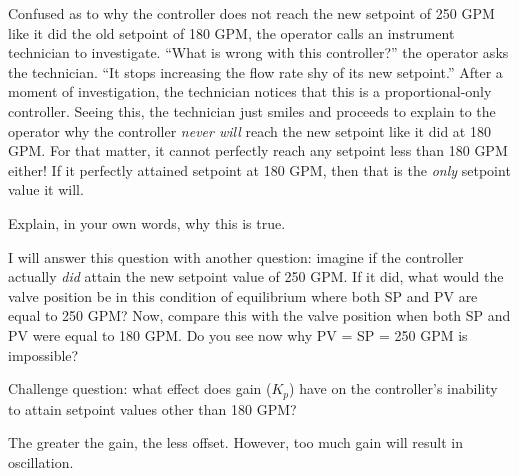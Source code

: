 Confused as to why the controller does not reach the new setpoint of 250 GPM like it did the old setpoint of 180 GPM, the operator calls an instrument technician to investigate.  ``What is wrong with this controller?'' the operator asks the technician.  ``It stops increasing the flow rate shy of its new setpoint.''  After a moment of investigation, the technician notices that this is a proportional-only controller.  Seeing this, the technician just smiles and proceeds to explain to the operator why the controller {\it never will} reach the new setpoint like it did at 180 GPM.  For that matter, it cannot perfectly reach any setpoint less than 180 GPM either!  If it perfectly attained setpoint at 180 GPM, then that is the {\it only} setpoint value it will.

Explain, in your own words, why this is true.







I will answer this question with another question: imagine if the controller actually {\it did} attain the new setpoint value of 250 GPM.  If it did, what would the valve position be in this condition of equilibrium where both SP and PV are equal to 250 GPM?  Now, compare this with the valve position when both SP and PV were equal to 180 GPM.  Do you see now why PV = SP = 250 GPM is impossible?

\vskip 10pt

Challenge question: what effect does gain ($K_p$) have on the controller's inability to attain setpoint values other than 180 GPM?







The greater the gain, the less offset.  However, too much gain will result in oscillation.





